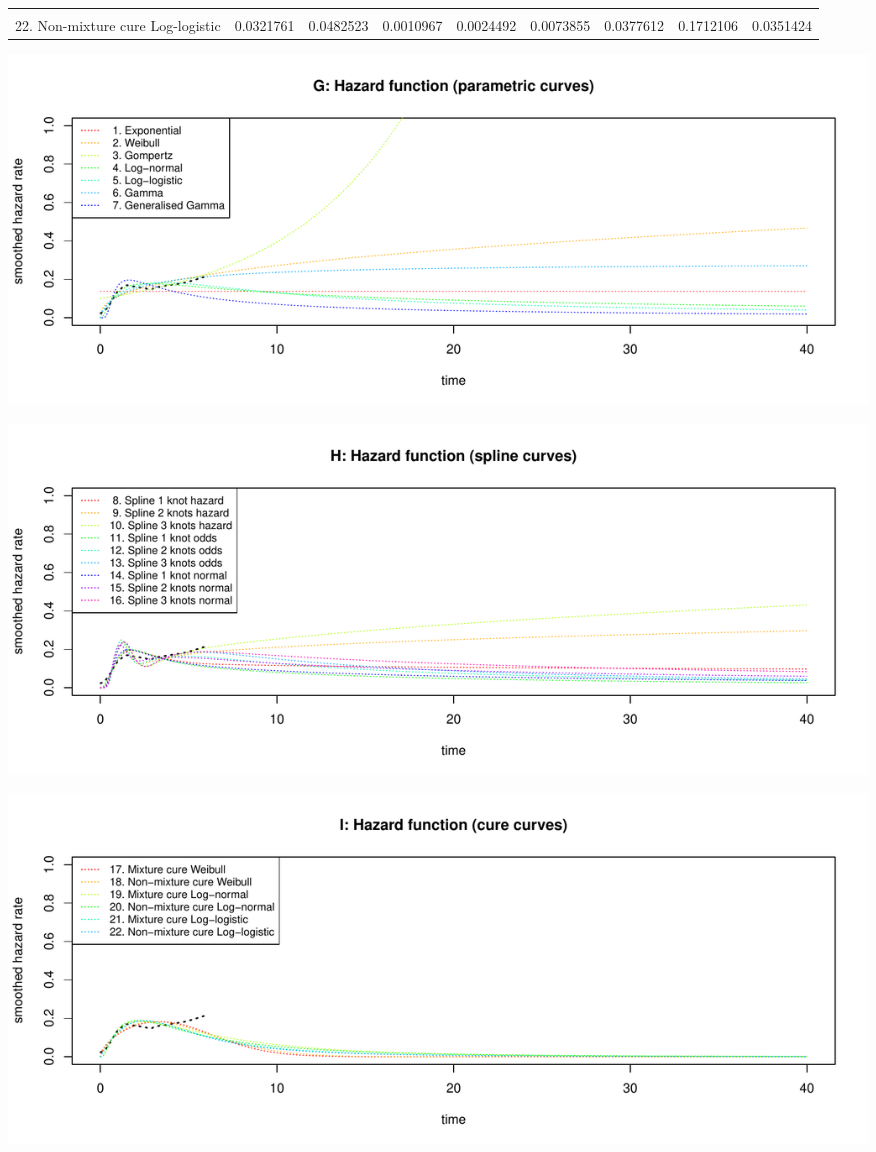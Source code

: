 \documentclass[]{article}
\begin{document}
\begin{table}
{\begin{tabular}[t]{lrrrrrrrr}
\cellcolor{gray!6}{21. Mixture cure Log-logistic} & \cellcolor{gray!6}{0.0336695} & \cellcolor{gray!6}{0.0485634} & \cellcolor{gray!6}{0.0012991} & \cellcolor{gray!6}{0.0028998} & \cellcolor{gray!6}{0.0085638} & \cellcolor{gray!6}{0.0419015} & \cellcolor{gray!6}{0.1712400} & \cellcolor{gray!6}{0.0388233}\\
22. Non-mixture cure Log-logistic & 0.0321761 & 0.0482523 & 0.0010967 & 0.0024492 & 0.0073855 & 0.0377612 & 0.1712106 & 0.0351424\\
\bottomrule
\end{tabular}}
\end{table}

\begin{flushleft}\includegraphics[height=0.29\textheight]{Images/validate_extrapolation2-7} \end{flushleft}

\begin{flushleft}\includegraphics[height=0.29\textheight]{Images/validate_extrapolation2-8} \end{flushleft}

\begin{flushleft}\includegraphics[height=0.29\textheight]{Images/validate_extrapolation2-9} \end{flushleft}
\end{document}
